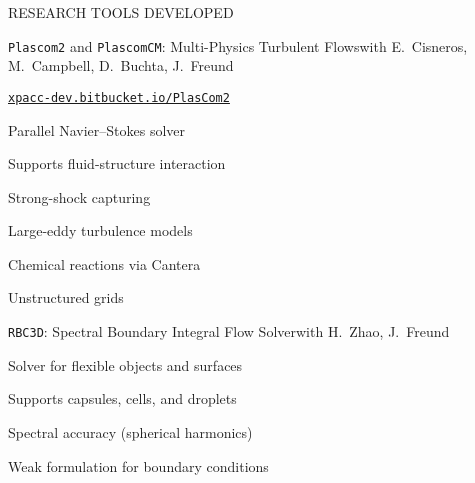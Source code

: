 \documentclass{resume} %
\begin{document}
\begin{rSection}{{\Large R}ESEARCH TOOLS DEVELOPED}
\begin{rSubsections}{\texttt{Plascom2} and \texttt{PlascomCM}: Multi-Physics Turbulent Flows}{}{with E.\ Cisneros, M.\ Campbell, D.\ Buchta, J.\ Freund}{}

\vspace{-0.4cm}
\href{https://xpacc-dev.bitbucket.io/PlasCom2/}{\texttt{xpacc-dev.bitbucket.io/PlasCom2}}

    \vspace{-0.1cm}
    \begin{minipage}{0.45\linewidth}
	\begin{list}{\textbullet}{\leftmargin=2.5em} 
     	\item Parallel Navier--Stokes solver
        \item Supports fluid-structure interaction
        \item Strong-shock capturing
  	\end{list}
    \end{minipage}
    \hspace{-0.5cm}
    \begin{minipage}{0.65\linewidth}
	\begin{list}{\textbullet}{\leftmargin=2.5em} 
        \item Large-eddy turbulence models 
        \item Chemical reactions via Cantera
        \item Unstructured grids
  	\end{list}
    \end{minipage}
\end{rSubsections}
\medskip

\begin{rSubsections}{\texttt{RBC3D}: Spectral Boundary Integral Flow Solver}{}{with H.\ Zhao, J.\ Freund}{}

    \vspace{-0.2cm}
    \begin{minipage}{0.45\linewidth}
	\begin{list}{\textbullet}{\leftmargin=2.5em} 
        \item Solver for flexible objects and surfaces
        \item Supports capsules, cells, and droplets

  	\end{list}
    \end{minipage}
    \hspace{-0.5cm}
    \begin{minipage}{0.65\linewidth}
	\begin{list}{\textbullet}{\leftmargin=2.5em} 
        \item Spectral accuracy (spherical harmonics)
        \item Weak formulation for boundary conditions
  	\end{list}
    \end{minipage}
\end{rSubsections}
\medskip


\end{rSection}
\end{document}
